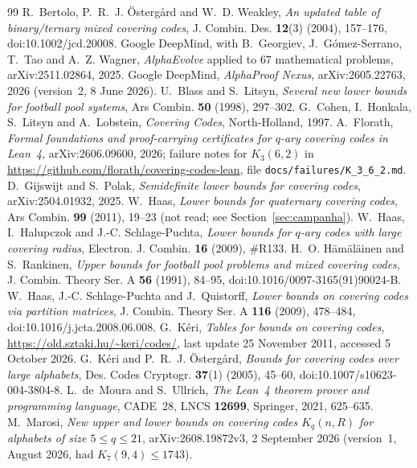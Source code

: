 \documentclass[11pt]{amsart}
\theoremstyle{definition}
\theoremstyle{remark}
\begin{document}
\begin{thebibliography}{99}
R.~Bertolo, P.~R.~J. Östergård and W.~D. Weakley, \emph{An updated table of binary/ternary mixed covering codes}, J. Combin. Des. \textbf{12}(3) (2004), 157--176, doi:10.1002/jcd.20008.
Google DeepMind, with B.~Georgiev, J.~Gómez-Serrano, T.~Tao and A.~Z. Wagner, \emph{AlphaEvolve} applied to $67$ mathematical problems, arXiv:2511.02864, 2025.
Google DeepMind, \emph{AlphaProof Nexus}, arXiv:2605.22763, 2026 (version~2, 8 June 2026).
U.~Blass and S.~Litsyn, \emph{Several new lower bounds for football pool systems}, Ars Combin. \textbf{50} (1998), 297--302.
G.~Cohen, I.~Honkala, S.~Litsyn and A.~Lobstein, \emph{Covering Codes}, North-Holland, 1997.
A.~Florath, \emph{Formal foundations and proof-carrying certificates for $q$-ary covering codes in Lean~4}, arXiv:2606.09600, 2026; failure notes for $K_3(6,2)$ in \url{https://github.com/florath/covering-codes-lean}, file \texttt{docs/failures/K\_3\_6\_2.md}.
D.~Gijswijt and S.~Polak, \emph{Semidefinite lower bounds for covering codes}, arXiv:2504.01932, 2025.
W.~Haas, \emph{Lower bounds for quaternary covering codes}, Ars Combin. \textbf{99} (2011), 19--23 (not read; see Section~\ref{sec:campanha}).
W.~Haas, I.~Halupczok and J.-C. Schlage-Puchta, \emph{Lower bounds for $q$-ary codes with large covering radius}, Electron. J. Combin. \textbf{16} (2009), \#R133.
H.~O. Hämäläinen and S.~Rankinen, \emph{Upper bounds for football pool problems and mixed covering codes}, J. Combin. Theory Ser. A \textbf{56} (1991), 84--95, doi:10.1016/0097-3165(91)90024-B.
W.~Haas, J.-C. Schlage-Puchta and J.~Quistorff, \emph{Lower bounds on covering codes via partition matrices}, J. Combin. Theory Ser. A \textbf{116} (2009), 478--484, doi:10.1016/j.jcta.2008.06.008.
G.~Kéri, \emph{Tables for bounds on covering codes}, \url{https://old.sztaki.hu/~keri/codes/}, last update 25 November 2011, accessed 5 October 2026.
G.~Kéri and P.~R.~J. Östergård, \emph{Bounds for covering codes over large alphabets}, Des. Codes Cryptogr. \textbf{37}(1) (2005), 45--60, doi:10.1007/s10623-004-3804-8.
L.~de~Moura and S.~Ullrich, \emph{The Lean~4 theorem prover and programming language}, CADE~28, LNCS \textbf{12699}, Springer, 2021, 625--635.
M.~Marosi, \emph{New upper and lower bounds on covering codes $K_q(n,R)$ for alphabets of size $5\le q\le 21$}, arXiv:2608.19872v3, 2 September 2026 (version~1, August 2026, had $K_7(9,4)\le 1743$).

\end{thebibliography}
\end{document}
